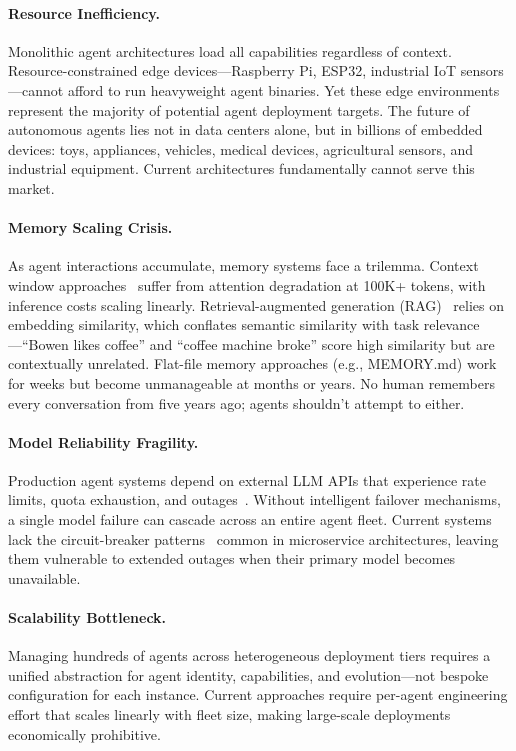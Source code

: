 \documentclass{article}
\begin{document}
\paragraph{Resource Inefficiency.} Monolithic agent architectures load all capabilities regardless of context. Resource-constrained edge devices—Raspberry Pi, ESP32, industrial IoT sensors—cannot afford to run heavyweight agent binaries. Yet these edge environments represent the majority of potential agent deployment targets. The future of autonomous agents lies not in data centers alone, but in billions of embedded devices: toys, appliances, vehicles, medical devices, agricultural sensors, and industrial equipment. Current architectures fundamentally cannot serve this market.

\paragraph{Memory Scaling Crisis.} As agent interactions accumulate, memory systems face a trilemma. Context window approaches~\cite{xiong2023memorizing} suffer from attention degradation at 100K+ tokens, with inference costs scaling linearly. Retrieval-augmented generation (RAG)~\cite{lewis2020retrieval} relies on embedding similarity, which conflates semantic similarity with task relevance—``Bowen likes coffee'' and ``coffee machine broke'' score high similarity but are contextually unrelated. Flat-file memory approaches (e.g., MEMORY.md) work for weeks but become unmanageable at months or years. No human remembers every conversation from five years ago; agents shouldn't attempt to either.

\paragraph{Model Reliability Fragility.} Production agent systems depend on external LLM APIs that experience rate limits, quota exhaustion, and outages~\cite{tan2020head}. Without intelligent failover mechanisms, a single model failure can cascade across an entire agent fleet. Current systems lack the circuit-breaker patterns~\cite{ford2000circuit} common in microservice architectures, leaving them vulnerable to extended outages when their primary model becomes unavailable.

\paragraph{Scalability Bottleneck.} Managing hundreds of agents across heterogeneous deployment tiers requires a unified abstraction for agent identity, capabilities, and evolution—not bespoke configuration for each instance. Current approaches require per-agent engineering effort that scales linearly with fleet size, making large-scale deployments economically prohibitive.
\end{document}

